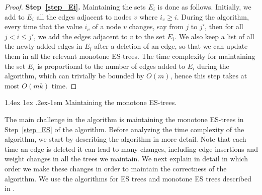 \documentclass[11pt]{article}
\makeatletter
\theoremstyle{definition}
\theoremstyle{remark}
\renewcommand{\paragraph}{%
  \@startsection{paragraph}{4}%
  {\z@}{1.4ex \@plus 1ex \@minus .2ex}{-1em}%
  {\normalfont\normalsize\bfseries}%
}
\makeatother
\begin{document}
\begin{titlepage}
\begin{proof}
\textbf{Step~\ref{step_Ei}.} Maintaining the sets $E_i$ is done as follows. Initially, we add to $E_i$ all the edges adjacent to nodes $v$ where $i_v \geq i$. During the algorithm, every time that the value $i_v$ of a node $v$ changes, say from $j$ to $j'$, then for all $j < i \leq j'$, we add the edges adjacent to $v$ to the set $E_i$. We also keep a list of all the newly added edges in $E_i$ after a deletion of an edge, so that we can update them in all the relevant monotone ES-trees. The time complexity for maintaining the set $E_i$ is proportional to the number of edges added to $E_i$ during the algorithm, which can trivially be bounded by $O(m)$, hence this step takes at most $O(mk)$ time.  
\end{proof}

\paragraph{Maintaining the monotone ES-trees.} 

The main challenge in the algorithm is maintaining the monotone ES-trees in Step~\ref{step_ES} of the algorithm. Before analyzing the time complexity of the algorithm, we start by describing the algorithm in more detail. Note that each time an edge is deleted it can lead to many changes, including edge insertions and weight changes in all the trees we maintain. We next explain in detail in which order we make these changes in order to maintain the correctness of the algorithm. We use the algorithms for ES trees and monotone ES trees described in .


\end{titlepage}
\end{document}
